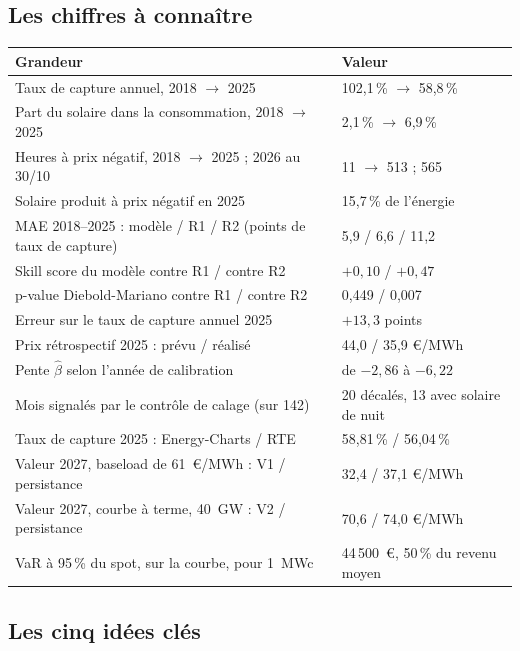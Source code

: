 \documentclass[11pt,a4paper]{article}
\begin{document}
\subsection{Les chiffres à connaître}

\begin{center}
\begin{tabularx}{\linewidth}{Yl}
\toprule
\textbf{Grandeur} & \textbf{Valeur} \\
\midrule
Taux de capture annuel, 2018 $\to$ 2025 & 102,1\,\% $\to$ 58,8\,\% \\
Part du solaire dans la consommation, 2018 $\to$ 2025 & 2,1\,\% $\to$ 6,9\,\% \\
Heures à prix négatif, 2018 $\to$ 2025 ; 2026 au 30/10 & 11 $\to$ 513 ; 565 \\
Solaire produit à prix négatif en 2025 & 15,7\,\% de l'énergie \\
MAE 2018--2025 : modèle / R1 / R2 (points de taux de capture) & 5,9 / 6,6 / 11,2 \\
Skill score du modèle contre R1 / contre R2 & $+0{,}10$ / $+0{,}47$ \\
p-value Diebold-Mariano contre R1 / contre R2 & 0,449 / 0,007 \\
Erreur sur le taux de capture annuel 2025 & $+13{,}3$ points \\
Prix rétrospectif 2025 : prévu / réalisé & 44,0 / 35,9 €/MWh \\
Pente $\hat\beta$ selon l'année de calibration & de $-2{,}86$ à $-6{,}22$ \\
Mois signalés par le contrôle de calage (sur 142) & 20 décalés, 13 avec solaire de nuit \\
Taux de capture 2025 : Energy-Charts / RTE & 58,81\,\% / 56,04\,\% \\
Valeur 2027, baseload de 61~€/MWh : V1 / persistance & 32,4 / 37,1 €/MWh \\
Valeur 2027, courbe à terme, 40~GW : V2 / persistance & 70,6 / 74,0 €/MWh \\
VaR à 95\,\% du spot, sur la courbe, pour 1~MWc & 44\,500~€, 50\,\% du revenu moyen \\
\bottomrule
\end{tabularx}
\end{center}

\subsection{Les cinq idées clés}
\end{document}

